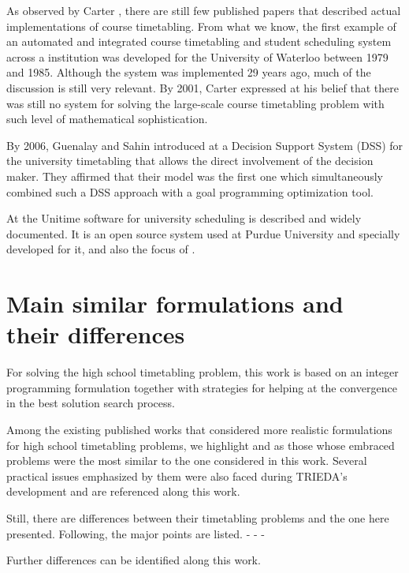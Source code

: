 As observed by Carter \cite{Carter2001}, there are still few published papers that described actual implementations of course timetabling. From what we know, the first example of an automated and integrated course timetabling and student scheduling system across a institution was developed for the University of Waterloo between 1979 and 1985. Although the system was implemented 29 years ago, much of the discussion is still very relevant. By 2001, Carter expressed at \cite{Carter2001} his belief that there was still no system for solving the large-scale course timetabling problem with such level of mathematical sophistication.

By 2006, Guenalay and Sahin introduced at \cite{Guenalay2006} a Decision Support System (DSS) for the university timetabling that allows the direct involvement of the decision maker. They affirmed that their model was the first one which simultaneously combined such a DSS approach with a goal programming optimization tool.

At \cite{Unitime} the Unitime software for university scheduling is described and widely documented. It is an open source system used at Purdue University and specially developed for it, and also the focus of \cite{Murray2007}.


\section{Main similar formulations and their differences}

For solving the high school timetabling problem, this work is based on an integer programming formulation together with strategies for helping at the convergence in the best solution search process.

Among the existing published works that considered more realistic formulations for high school timetabling problems, we highlight \cite{Birbas2009} and \cite{Birbas2009} as those whose embraced problems were the most similar to the one considered in this work. Several practical issues emphasized by them were also faced during TRIEDA's development and are referenced along this work.

Still, there are differences between their timetabling problems and the one here presented. Following, the major points are listed.
-
-
-

Further differences can be identified along this work.

